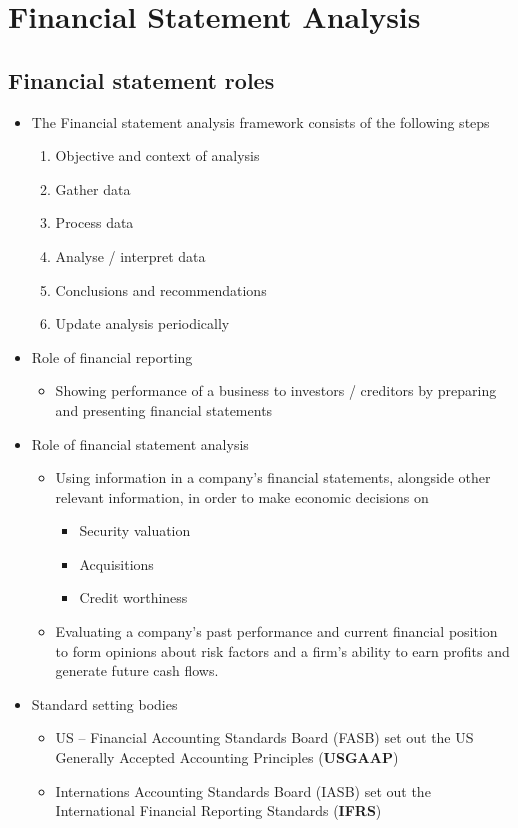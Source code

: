 \documentclass[../notes_compiled.tex]{subfiles}
\begin{document}
\section{Financial Statement Analysis}
\subsection{Financial statement roles}
\begin{itemize}
\item The Financial statement analysis framework consists of the following steps
\begin{enumerate}
\item Objective and context of analysis
\item Gather data
\item Process data
\item Analyse / interpret data
\item Conclusions and recommendations
\item Update analysis periodically
\end{enumerate}
\item Role of financial reporting
\begin{itemize}
\item Showing performance of a business to investors / creditors by preparing and presenting financial statements
\end{itemize}
\item Role of financial statement analysis
\begin{itemize}
\item Using information in a company's financial statements, alongside other relevant information, in order to make economic decisions on
\begin{itemize}
\item Security valuation
\item Acquisitions
\item Credit worthiness
\end{itemize}
\item Evaluating a company's past performance and current financial position to form opinions about risk factors and a firm's ability to earn profits and generate future cash flows.
\end{itemize}
\item Standard setting bodies
\begin{itemize}
\item US -- Financial Accounting Standards Board (FASB) set out the US Generally Accepted Accounting Principles (\textbf{USGAAP})
\item Internations Accounting Standards Board (IASB) set out the International Financial Reporting Standards (\textbf{IFRS})
\end{itemize}
\end{itemize}
\end{document}
